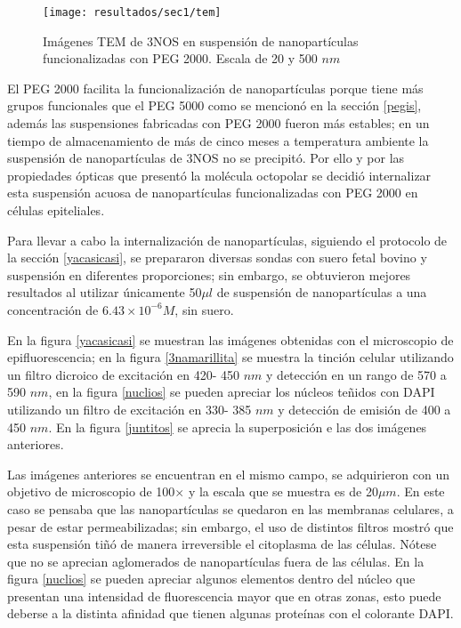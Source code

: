\begin{figure}[H]
\centering
\texttt{[image: resultados/sec1/tem]}
\caption{Im\'agenes TEM de 3NOS en suspensi\'on de nanopart\'iculas funcionalizadas con PEG 2000. Escala de 20 y 500 $nm$}\label{temi}
\end{figure}

El PEG 2000 facilita la funcionalizaci\'on de nanopart\'iculas porque tiene m\'as grupos funcionales que el PEG 5000 como se mencion\'o en la secci\'on \ref{pegis}, adem\'as las suspensiones fabricadas con PEG 2000 fueron m\'as estables; en un tiempo de almacenamiento de m\'as de cinco meses a temperatura ambiente la suspensi\'on de nanopart\'iculas de 3NOS no se precipit\'o. Por ello y por las propiedades \'opticas que present\'o la mol\'ecula octopolar se decidi\'o internalizar esta suspensi\'on acuosa de nanopart\'iculas funcionalizadas con PEG 2000 en c\'elulas epiteliales.

Para llevar a cabo la internalizaci\'on de nanopart\'iculas, siguiendo el protocolo de la secci\'on \ref{yacasicasi}, se prepararon diversas sondas con suero fetal bovino y suspensi\'on en diferentes proporciones; sin embargo, se obtuvieron mejores resultados al utilizar \'unicamente 50$\mu l$ de suspensi\'on de nanopart\'iculas a una concentraci\'on de $6.43 \times 10^{-6} M$, sin suero. 

En la figura \ref{yacasicasi} se muestran las im\'agenes obtenidas con el microscopio de epifluorescencia; en la figura \ref{3namarillita} se muestra la tinci\'on celular utilizando un filtro dicroico de excitaci\'on en 420- 450 $nm$ y detecci\'on en un rango de 570 a 590 $nm$, en la figura \ref{nuclios} se pueden apreciar los n\'ucleos te\~{n}idos con DAPI utilizando un filtro de excitaci\'on en 330- 385 $nm$ y detecci\'on de emisi\'on de 400 a 450 $nm$. En la figura \ref{juntitos} se aprecia la superposici\'on e las dos im\'agenes anteriores.

Las im\'agenes anteriores se encuentran en el mismo campo, se adquirieron con un objetivo de microscopio de 100$\times$ y la escala que se muestra es de 20$\mu m$. En este caso se pensaba que las nanopart\'iculas se quedaron en las membranas celulares, a pesar de estar permeabilizadas; sin embargo, el uso de distintos filtros mostr\'o que esta suspensi\'on ti\~{n}\'o de manera irreversible el citoplasma de las c\'elulas. N\'otese que no se aprecian aglomerados de nanopart\'iculas fuera de las c\'elulas. En la figura \ref{nuclios} se pueden apreciar algunos elementos dentro del n\'ucleo que presentan una intensidad de fluorescencia mayor que en otras zonas, esto puede deberse a la distinta afinidad que tienen algunas prote\'inas con el colorante DAPI.

